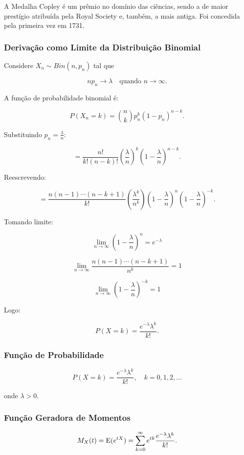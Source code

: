 A Medalha Copley é um prêmio no domínio das ciências, sendo a de maior
prestígio atribuída pela Royal Society e, também, a mais antiga. Foi concedida
pela primeira vez em 1731. \vskip0.3cm



\subsubsection{Derivação como Limite da Distribuição Binomial}

Considere $X_n \sim Bin(n,p_n)$ tal que

\[
n p_n \to \lambda \quad \text{quando } n\to\infty.
\]

A função de probabilidade binomial é:

\[
P(X_n = k)
=
\binom{n}{k} p_n^k (1-p_n)^{n-k}.
\]

Substituindo $p_n = \frac{\lambda}{n}$:

\[
=
\frac{n!}{k!(n-k)!}
\left(\frac{\lambda}{n}\right)^k
\left(1-\frac{\lambda}{n}\right)^{n-k}.
\]

Reescrevendo:

\[
=
\frac{n(n-1)\cdots(n-k+1)}{k!}
\left(\frac{\lambda^k}{n^k}\right)
\left(1-\frac{\lambda}{n}\right)^n
\left(1-\frac{\lambda}{n}\right)^{-k}.
\]

Tomando limite:

\[
\lim_{n\to\infty}
\left(1-\frac{\lambda}{n}\right)^n
=
e^{-\lambda}
\]

\[
\lim_{n\to\infty}
\frac{n(n-1)\cdots(n-k+1)}{n^k}
=
1
\]

\[
\lim_{n\to\infty}
\left(1-\frac{\lambda}{n}\right)^{-k}
=
1
\]

Logo:

\[
P(X=k)
=
\frac{e^{-\lambda}\lambda^k}{k!}.
\]

\subsubsection{Função de Probabilidade}

\[
P(X=k)
=
\frac{e^{-\lambda}\lambda^k}{k!},
\quad k=0,1,2,\dots
\]

onde $\lambda>0$.

\subsubsection{Função Geradora de Momentos}

\[
M_X(t)
=
\operatorname{E}(e^{tX})
=
\sum_{k=0}^{\infty}
e^{tk}
\frac{e^{-\lambda}\lambda^k}{k!}.
\]

